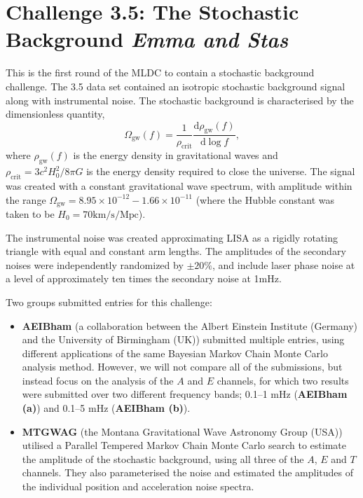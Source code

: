 \documentclass{iopart}
\begin{document}
\section{Challenge 3.5: The Stochastic Background {\it Emma and Stas}}

This is the first round of the MLDC to contain a stochastic background challenge.
The 3.5 data set contained an isotropic stochastic background signal
along with instrumental noise. The stochastic background is characterised
by the dimensionless quantity,
\begin{equation}
\Omega_{\mathrm{gw}}(f)=\frac{1}{\rho_{\mathrm{crit}}}\frac{\mathrm{d} \rho_{\mathrm{gw}}(f)}{\mathrm{d} \log{f}},
\end{equation}
where $\rho_{\mathrm{gw}}(f)$ is the energy density in gravitational waves
and $\rho_{\mathrm{crit}}=3c^2H_0^2/8\pi G$ is the energy density required
to close the universe. 
The signal was created with a constant
gravitational wave spectrum, 
with amplitude within the range $\Omega_{\mathrm{gw}} = 8.95\times 10^{-12} - 1.66\times 10^{-11}$
(where the Hubble constant was taken to be $H_0=70 \mathrm{km}/\mathrm{s}/\mathrm{Mpc}$).

The instrumental noise was created approximating LISA as a rigidly rotating
triangle with equal and constant arm lengths.
The amplitudes of the 
secondary noises were independently randomized  by $\pm 20\%$,
and include laser phase noise at a level of approximately ten times the secondary 
noise at 1mHz.

Two groups submitted entries for this challenge:
\begin{itemize}
\item \textbf{AEIBham} (a collaboration between the Albert Einstein Institute
(Germany) and the University of Birmingham (UK)) submitted multiple entries,
using different applications of the same Bayesian Markov Chain Monte Carlo
analysis method. However, we will not compare all of the submissions, but
instead focus on the analysis of the $A$ and $E$ channels, for which two results were submitted
over two different frequency bands; 0.1--1 mHz (\textbf{AEIBham (a)})
and 0.1--5 mHz (\textbf{AEIBham (b)}).
\item \textbf{MTGWAG} (the Montana Gravitational Wave Astronomy Group (USA)) 
utilised a Parallel Tempered Markov Chain Monte Carlo search to
estimate the amplitude of the stochastic background, using all three of the 
$A$, $E$ and $T$ channels. They also parameterised
the noise and estimated the amplitudes of the individual position and 
acceleration noise spectra.
\end{itemize}
\end{document}
